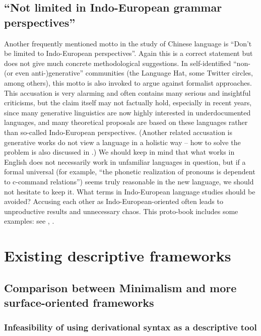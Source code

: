\documentclass[../main.tex]{subfiles}
\begin{document}
\subsection{``Not limited in Indo-European grammar perspectives''}

Another frequently mentioned motto in the study of Chinese language is ``Don't be limited to Indo-European
perspectives''. Again this is a correct statement but does not give much concrete methodological suggestions.
In self-identified ``non-(or even anti-)generative'' communities (the Language Hat, some Twitter circles, 
among others), this motto is also invoked to argue against formalist approaches. This accusation is very alarming and often contains many serious and insightful criticisms, but the claim itself may not factually 
hold, especially in recent years, since many generative linguistics are now highly interested in
underdocumented languages, and many theoretical proposals \citep{preminger2014agreement} are based on %
these languages rather than so-called Indo-European perspectives. (Another related accusation is 
generative works do not view a language in a holistic way -- how to solve the problem is also 
discussed in .) We should keep in mind 
that what works in English does not necessarily work in unfamiliar languages in question, but if 
a formal universal (for example, ``the phonetic realization of pronouns is dependent to c-command relations'')
seems truly reasonable in the new language, we should not hesitate to keep it.
What terms in Indo-European language studies should be avoided? Accusing each other as Indo-European-oriented 
often leads to unproductive results and unnecessary chaos. This proto-book includes some examples: 
see , . %

\section{Existing descriptive frameworks}\label{sec:descriptive-framework}

\subsection{Comparison between Minimalism and more surface-oriented frameworks}

\subsubsection{Infeasibility of using derivational syntax as a descriptive tool}\label{sec:generative-no-good}
\end{document}
